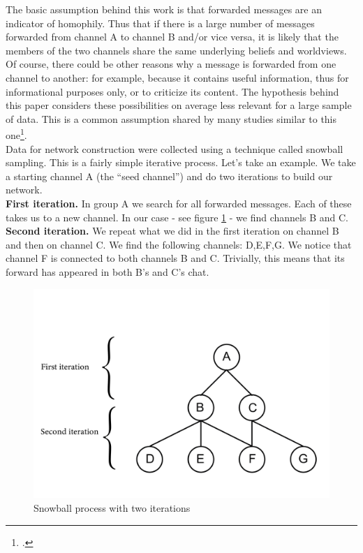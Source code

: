 \documentclass[a4paper,twoside,12pt, openany]{book}
\begin{document}
The basic assumption behind this work is that forwarded messages are an indicator of homophily. Thus that if there is a large number of messages forwarded from channel A to channel B and/or vice versa, it is likely that the members of the two channels share the same underlying beliefs and worldviews. Of course, there could be other reasons why a message is forwarded from one channel to another: for example, because it contains useful information, thus for informational purposes only, or to criticize its content. The hypothesis behind this paper considers these possibilities on average less relevant for a large sample of data. This is a common assumption shared by many studies similar to this one\footcite{alvisi2024}.\\
Data for network construction were collected using a technique called snowball sampling. This is a fairly simple iterative process. Let's take an example. We take a starting channel A (the \enquote{seed channel}) and do two iterations to build our network.\\

\textbf{First iteration.} In group A we search for all forwarded messages. Each of these takes us to a new channel. In our case - see figure \ref{fig:snowball} - we find channels B and C.\\

\textbf{Second iteration.} We repeat what we did in the first iteration on channel B and then on channel C. We find the following channels: D,E,F,G. We notice that channel F is connected to both channels B and C. Trivially, this means that its forward has appeared in both B's and C's chat.\\
\pagebreak

\begin{figure}[h!]
	\centering
	\includegraphics[scale=0.3]{sample_example.png}
	\caption{Snowball process with two iterations}
	\label{fig:snowball}
\end{figure}
\vspace{20pt}
\end{document}
